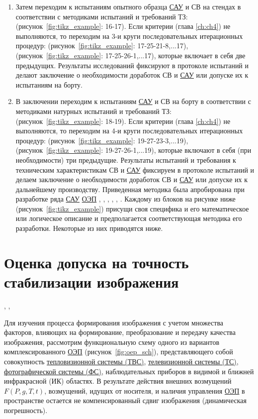 \begin{enumerate}
	\item Затем переходим к испытаниям опытного образца \hyperref[acroSAU]{САУ} и СВ на стендах в соответствии с методиками испытаний и требований ТЗ: (рисунок~\ref{fig:tikz_example}: 16-17). Если критерии (глава \ref{ch:ch4}) не выполняются, то переходим на 
	3-и круги последовательных итерационных процедур: (рисунок~\ref{fig:tikz_example}: 17-25-21-8,...17), (рисунок~\ref{fig:tikz_example}: 17-25-26-1,...17), которые включает в себя две предыдущих. Результаты исследований фиксируют в протоколе испытаний и делают заключение о необходимости доработок СВ и \hyperref[acroSAU]{САУ} или допуске их к испытаниям на борту. 
	
	\item В заключении переходим к испытаниям \hyperref[acroSAU]{САУ} и СВ на борту в соответствии с методиками натурных испытаний и требований ТЗ: (рисунок~\ref{fig:tikz_example}: 18-19). Если критерии (глава \ref{ch:ch4}) не выполняются, то переходим на 
	4-и круги последовательных итерационных процедур: (рисунок~\ref{fig:tikz_example}: 19-27-23-3,...19), (рисунок~\ref{fig:tikz_example}: 19-27-26-1,...19), которые включают в себя (при необходимости) три предыдущие. Результаты испытаний и требования к техническим характеристикам СВ и \hyperref[acroSAU]{САУ} фиксируем в протоколе испытаний и делаем заключение о необходимости доработок СВ и \hyperref[acroSAU]{САУ} или допуске их к дальнейшему производству.
	Приведенная методика была апробирована при разработке ряда \hyperref[acroSAU]{САУ} \hyperref[acroEOS]{ОЭП} \cite[]{Belyakov}, \cite[]{Karpov}, \cite[]{Baloev16}, \cite[]{Karpov17}, \cite[]{Gerasin19}, \cite[]{Molin21}. Каждому из блоков на рисунке ниже (рисунок~\ref{fig:tikz_example}) присущи своя специфика и его математическое или логическое описание и предполагается соответствующая методика его разработки. Некоторые из них приводятся ниже.

\end{enumerate}

\section{Оценка допуска на точность стабилизации изображения} \cite[]{Belyakov}, \cite[]{Sokolski22}, \cite[]{Molin21} \label{sec:ch2/sec2} 



Для изучения процесса формирования изображения с учетом множества факторов, влияющих на формирование, преобразование и передачу качества изображения, рассмотрим функциональную схему одного из вариантов комплексированного \hyperref[acroEOS]{ОЭП} (рисунок~\ref{fig:oep_sch}), представляющего собой совокупность \hyperref[acroTVS]{тепловизионной системы (ТВС)}, \hyperref[acroTS]{телевизионной системы (ТС)}, \hyperref[acroFS]{фотографической системы (ФС)}, наблюдательных приборов в видимой и ближней инфракрасной (ИК) областях. В результате действия внешних возмущений $F(P,g,T,t)$, возмущений, идущих от носителя, и наличия управления \hyperref[acroEOS]{ОЭП} в пространстве остается не компенсированный сдвиг изображения (динамическая погрешность).


